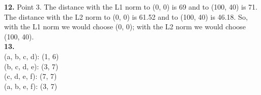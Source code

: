 \documentclass[10pt]{amsart}
\begin{document}
\textbf{12.} Point 3. The distance with the L1 norm to (0, 0) is 69 and to 
(100, 40) is 71. The distance with the L2 norm to (0, 0) is 61.52 and to 
(100, 40) is 46.18. So, with the L1 norm we would choose (0, 0); with the L2
norm we would choose (100, 40).\\

\textbf{13.}  \\

(a, b, c, d): (1, 6) \\  
(b, c, d, e): (3, 7) \\
(c, d, e, f): (7, 7) \\
(a, b, e, f): (3, 7) \\
\end{document}

